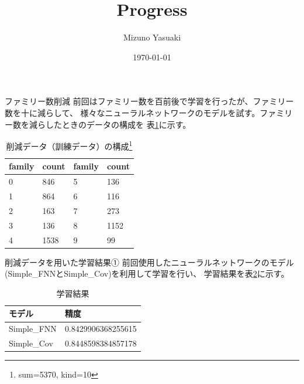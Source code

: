 \documentclass[dvipdfmx]{beamer}
\title{Progress}
\date{\today}
\author{Mizuno Yasuaki}
\begin{document}
  \maketitle
  
  \begin{frame}{ファミリー数削減}
    前回はファミリー数を百前後で学習を行ったが、ファミリー数を十に減らして、
    様々なニューラルネットワークのモデルを試す。ファミリー数を減らしたときのデータの構成を
    表\ref{tab:composition}に示す。
    \begin{table}
      \caption{削減データ（訓練データ）の構成\footnote{sum=5370, kind=10}}
      \label{tab:composition}
      \centering  
      \begin{tabular}{llll}
        \hline
        family & count & family & count \\
        \hline \hline
        0 & 846 & 5 & 136 \\
        1 & 864 & 6 & 116 \\
        2 & 163 & 7 & 273 \\
        3 & 136 & 8 & 1152 \\
        4 & 1538 & 9 & 99 \\
        \hline
      \end{tabular}
    \end{table}
  \end{frame}

  \begin{frame}{削減データを用いた学習結果①}
    前回使用したニューラルネットワークのモデル(Simple\_FNNとSimple\_Cov)を利用して学習を行い、
    学習結果を表\ref{tab:train_result}に示す。
    \begin{table}
      \caption{学習結果}
      \label{tab:train_result}
      \centering
      \begin{tabular}{ll}
        \hline
        モデル & 精度 \\
        \hline \hline
        Simple\_FNN & 0.8429906368255615 \\
        Simple\_Cov & 0.8448598384857178 \\
        \hline
      \end{tabular}
    \end{table}
  \end{frame}
\end{document}
